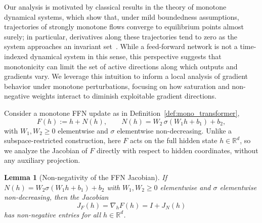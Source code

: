 \documentclass{article}
\theoremstyle{plain}
\newtheorem{lemma}[theorem]{Lemma}
\theoremstyle{definition}
\theoremstyle{remark}
\begin{document}
Our analysis is motivated by classical results in the theory of monotone dynamical systems, which show that, under mild boundedness assumptions, trajectories of strongly monotone flows converge to equilibrium points almost surely; in particular, derivatives along these trajectories tend to zero as the system approaches an invariant set~\cite{hirsch1985systems}. While a feed-forward network is not a time-indexed dynamical system in this sense, this perspective suggests that monotonicity can limit the set of active directions along which outputs and gradients vary. We leverage this intuition to inform a local analysis of gradient behavior under monotone perturbations, focusing on how saturation and non-negative weights interact to diminish exploitable gradient directions.

Consider a monotone FFN update as in Definition~\ref{def:mono_transformer},
\[
F(h) := h + N(h), \qquad N(h) = W_2\, \sigma(W_1 h + b_1) + b_2,
\]
with $W_1, W_2 \ge 0$ elementwise and $\sigma$ elementwise non-decreasing. Unlike
a subspace-restricted construction, here $F$ acts on the full hidden state
$h \in \mathbb{R}^d$, so we analyze the Jacobian of $F$ directly with respect to
hidden coordinates, without any auxiliary projection.





\begin{lemma}[Non-negativity of the FFN Jacobian]
\label{lem:jacobian-nonneg}
If $N(h) = W_2\sigma(W_1 h + b_1) + b_2$ with $W_1, W_2 \ge 0$ elementwise and
$\sigma$ elementwise non-decreasing, then the Jacobian
\[
J_F(h) = \nabla_h F(h) = I + J_N(h)
\]
has non-negative entries for all $h \in \mathbb{R}^d$.
\end{lemma}
\end{document}
